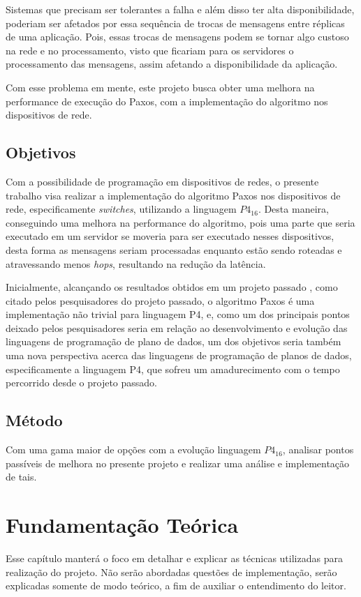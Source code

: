 \documentclass[12pt,
openright, 
oneside,
a4paper,
brazil]{facom-ufu-abntex2}
\theoremstyle{definition}
\begin{document}
Sistemas que precisam ser tolerantes a falha e além disso ter alta disponibilidade, 
poderiam ser afetados por essa sequência de trocas de mensagens entre réplicas de uma aplicação.
Pois, essas trocas de mensagens podem se tornar algo custoso na rede e no processamento,
visto que ficariam para os servidores o processamento das mensagens, assim afetando a 
disponibilidade da aplicação. 

Com esse problema em mente, este projeto busca obter uma melhora na performance de execução
do Paxos, com a implementação do algoritmo nos dispositivos de rede.


\section{Objetivos}
Com a possibilidade de programação em dispositivos de redes, o presente trabalho 
visa realizar a implementação do algoritmo Paxos nos dispositivos
de rede, especificamente \textit{switches}, utilizando a linguagem $P4_{16}$. 
Desta maneira, conseguindo uma melhora na performance do algoritmo, pois uma parte 
que seria executado em um servidor se moveria para ser executado nesses dispositivos, desta
forma as mensagens seriam processadas enquanto estão sendo roteadas e atravessando menos
\textit{hops}, resultando na redução da latência.

Inicialmente, alcançando os resultados obtidos em um projeto passado \citep{dang2016paxos},
como citado pelos pesquisadores do projeto passado, o algoritmo Paxos é uma implementação
não trivial para linguagem P4, e, como um dos principais pontos deixado pelos pesquisadores
seria em relação ao desenvolvimento e evolução das linguagens de programação de plano de dados,
um dos objetivos seria também uma nova perspectiva acerca das linguagens de programação de 
planos de dados, especificamente a linguagem P4, que sofreu um amadurecimento com o tempo 
percorrido desde o projeto passado.

\section{Método}
Com uma gama maior de opções com a evolução linguagem $P4_{16}$, 
analisar pontos passíveis de melhora no presente projeto e realizar uma 
análise e implementação de tais.


\chapter{Fundamentação Teórica}
Esse capítulo manterá o foco em detalhar e explicar as técnicas utilizadas
para realização do projeto. Não serão abordadas questões de implementação,
serão explicadas somente de modo teórico, a fim de auxiliar o entendimento do leitor.
\end{document}
